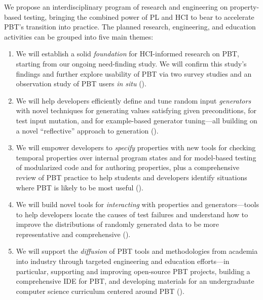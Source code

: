 We propose an interdisciplinary program of research and engineering on
{property-based testing}, bringing the combined power of PL and HCI to
bear to accelerate PBT's
transition into practice.
%
The planned research,
engineering, and education activities can be grouped into five main
themes: 
\begin{enumerate}[noitemsep]
\item We will establish a solid \emph{foundation} for HCI-informed research on PBT,
starting from our ongoing need-finding study. We will confirm
this study's findings and further explore usability of PBT via
two survey studies and an observation study
of PBT users {\em in situ} ().
%
\item We will help developers efficiently define and tune random input
\emph{generators} with novel techniques for generating values
satisfying given preconditions, for test input mutation, and for
example-based generator tuning---all building on a novel
``reflective'' approach to generation ().
%
\item We will empower developers to \emph{specify} properties with new
tools for checking temporal properties over internal program states
and for model-based testing of modularized code and for authoring
properties, plus a comprehensive review of PBT practice to help
students and developers identify situations where PBT is likely to be
most useful ().
%
\item We will build novel tools for {\em interacting} with properties
and generators---tools to help developers locate the causes of test
failures and understand how to improve the distributions of randomly
generated data to be more representative and
comprehensive\iflater{}\fi{} ().
%
\item We will support the {\em diffusion} of PBT tools and
methodologies from academia into industry through targeted engineering
and education efforts---in particular, supporting and
improving open-source PBT projects, building a
comprehensive IDE for PBT, and developing materials for an
undergraduate computer science curriculum centered around PBT
().
\end{enumerate}
